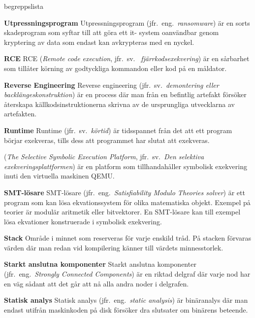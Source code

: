 \begin{labeling}{begreppslista}
    \item [\textbf{Utpressningsprogram}] Utpressningsprogram (jfr.\ eng.\
    \emph{ransomware}) är en sorts skadeprogram som syftar till att göra ett it-
    system oanvändbar genom kryptering av data som endast kan avkrypteras med
    en nyckel.

    \item [\textbf{RCE}] RCE (\emph{Remote code execution}, jfr.\ sv.
    \ \emph{fjärrkodsexekvering}) är en sårbarhet som tillåter körning av
    godtyckliga kommandon eller kod på en måldator.

    \item [\textbf{Reverse Engineering}] Reverse engineering (jfr.\ sv.\ \emph{demontering eller
        backlängeskonstruktion}) är en process där man från en
    befintlig artefakt försöker återskapa källkodsinstruktionerna
    skrivna av de ursprungliga utvecklarna av artefakten.

    \item [\textbf{Runtime}] Runtime (jfr.\ sv.\ \emph{körtid}) är tidsspannet
    från det att ett program börjar exekveras, tills dess att programmet har
    slutat att exekveras.

    \item [\textbf{\stoe}] \stoe (\emph{The Selective Symbolic Execution
        Platform}, jfr.\ sv.\ \emph{Den selektiva exekveringsplattformen}) är
    en platform som tillhandahåller symbolisk exekvering inuti den virtuella
    maskinen QEMU.\@

    \item [\textbf{SMT-lösare}] SMT-lösare (jfr.\ eng.\ \emph{Satisfiability Modulo
        Theories solver}) är ett program som kan lösa
    ekvationssystem för olika matematiska objekt. Exempel på
    teorier är modulär aritmetik eller bitvektorer. En SMT-lösare
    kan till exempel lösa ekvationer konstruerade i symbolisk
    exekvering.

    \item [\textbf{Stack}] Område i minnet som reserveras för varje
    enskild tråd.  På stacken förvaras värden där man redan vid
    kompilering känner till värdets minnesstorlek.

    \item [\textbf{Starkt anslutna komponenter}] Starkt anslutna komponenter
    (jfr.\ eng.\ \emph{Strongly Connected Components}) är en riktad delgraf där
    varje nod har en väg sådant att det går att nå alla andra noder i delgrafen.

    \item [\textbf{Statisk analys}] Statisk analys (jfr.\ eng.\ \emph{static
        analysis}) är binäranalys där man endast utifrån maskinkoden på disk
    försöker dra slutsater om binärens beteende.


\end{labeling}
